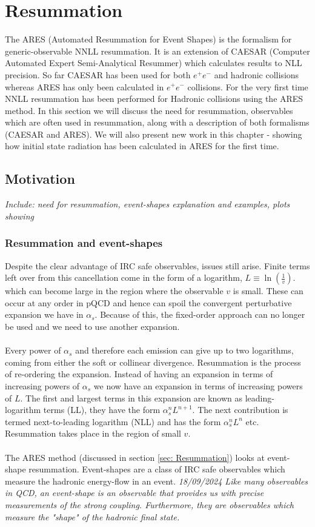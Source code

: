 \chapter{Resummation}

The ARES (Automated Resummation for Event Shapes) is the formalism for generic-observable NNLL resummation. It is an extension of CAESAR (Computer Automated Expert Semi-Analytical Resummer) which calculates results to NLL precision. So far CAESAR has been used for both $e^+e^-$ and hadronic collisions whereas ARES has only been calculated in $e^+e^-$ collisions. {\color{purple} For the very first time NNLL resummation has been performed for Hadronic collisions using the ARES method.} In this section we will discuss the need for resummation, observables which are often used in resummation, along with a description of both formalisms (CAESAR and ARES). We will also present new work in this chapter - showing how initial state radiation has been calculated in ARES for the first time.

\section{Motivation}
\emph{Include: need for resummation, event-shapes explanation and examples, plots showing}

\subsection{Resummation and event-shapes}
Despite the clear advantage of IRC safe observables, issues still arise. Finite terms left over from this cancellation come in the form of a logarithm, $L\equiv\ln\left(\frac{1}{v}\right)$. which can become large in the region where the observable $v$ is small. These can occur at any order in pQCD and hence can spoil the convergent perturbative expansion we have in $\alpha_s$. Because of this, the fixed-order approach can no longer be used and we need to use another expansion. \\ \\
Every power of $\alpha_s$ and therefore each emission can give up to two logarithms, coming from either the soft or collinear divergence. Resummation is the process of re-ordering the expansion. Instead of having an expansion in terms of increasing powers of $\alpha_s$ we now have an expansion in terms of increasing powers of $L$. The first and largest terms in this expansion are known as leading-logarithm terms (LL), they have the form $\alpha_s^nL^{n+1}$.  The next contribution is termed next-to-leading logarithm (NLL) and has the form $\alpha_s^nL^{n}$ etc. Resummation takes place in the region of small $v$.
\\\\The ARES method (discussed in section \ref{sec: Resummation}) looks at event-shape resummation.
Event-shapes are a class of IRC safe observables which measure the hadronic energy-flow in an event. \emph{18/09/2024 Like many observables in QCD, an event-shape is an observable that provides us with precise measurements of the strong coupling. Furthermore, they are observables which measure the "shape" of the hadronic final state.} 

